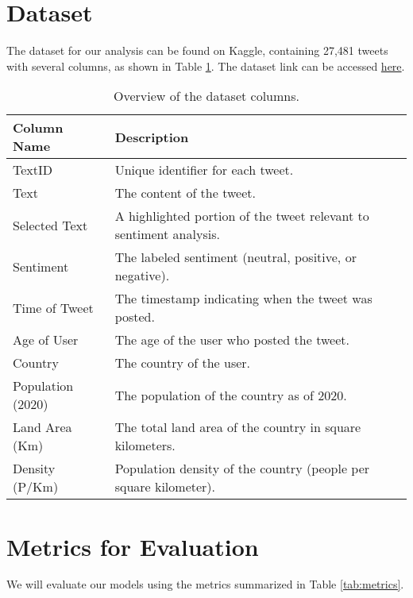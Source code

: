 \documentclass[runningheads]{llncs}
\begin{document}
\section{Dataset}
The dataset for our analysis can be found on Kaggle, containing 27,481 tweets with several columns, 
as shown in Table \ref{tab:dataset}. The dataset link can be accessed 
\textcolor{blue}{\href{https://www.kaggle.com/datasets/abhi8923shriv/sentiment-analysis-dataset?select=train.csv}{here}}.

\begin{table}[h!]
    \centering
    \begin{tabular}{|l|p{10cm}|}
        \hline
        \textbf{Column Name} & \textbf{Description} \\ \hline
        TextID & Unique identifier for each tweet. \\ \hline
        Text & The content of the tweet. \\ \hline
        Selected Text & A highlighted portion of the tweet relevant to sentiment analysis. \\ \hline
        Sentiment & The labeled sentiment (neutral, positive, or negative). \\ \hline
        Time of Tweet & The timestamp indicating when the tweet was posted. \\ \hline
        Age of User & The age of the user who posted the tweet. \\ \hline
        Country & The country of the user. \\ \hline
        Population (2020) & The population of the country as of 2020. \\ \hline
        Land Area (Km) & The total land area of the country in square kilometers. \\ \hline
        Density (P/Km) & Population density of the country (people per square kilometer). \\ \hline
    \end{tabular}
    \caption{Overview of the dataset columns.}
    \label{tab:dataset}
\end{table}

\newpage

\section{Metrics for Evaluation}
We will evaluate our models using the metrics summarized in Table \ref{tab:metrics}.
\end{document}
